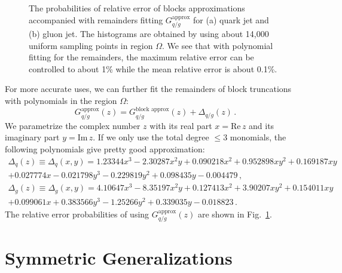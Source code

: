 \documentclass[letterpaper,11pt]{article}
\def\Fig#1{Fig.~{\ref{#1}}}
\DeclareRobustCommand{\Fig}[1]{Fig.~\ref{#1}}
\begin{document}
\begin{figure}[t]
\begin{center}
\qquad \quad
%
\caption{
%
The probabilities of relative error of blocks approximations accompanied with remainders fitting $G_{q/g}^{\text{approx}}$ for (a) quark jet and (b) gluon jet. The histograms are obtained by using about 14,000 uniform sampling points in region $\Omega$. We see that with polynomial fitting for the remainders, the maximum relative error can be controlled to about 1\% while the mean relative error is about 0.1\%.}
\label{fig:fit_approx_error}
\end{center}
\end{figure}

For more accurate uses, we can further fit the remainders of block truncations with polynomials in the region $\Omega$:
\begin{equation}
G_{q/g}^{\text{approx}} (z) =  G_{q/g}^{\text{block approx}}(z) + \Delta_{q/g}(z)\,.
\end{equation}
We parametrize the complex number $z$ with its real part $x=\mathrm{Re}\, z$ and its imaginary part $y = \mathrm{Im}\, z$. If we only use the total degree $\leq 3$ monomials, the following polynomials give pretty good approximation:
\begin{align}
\Delta_q(z)\equiv \Delta_q(x,y) = 1.23344 x^3-2.30287 x^2 y+0.090218 x^2+0.952898 x y^2+0.169187 x y\nonumber\\
+0.027774 x-0.021798 y^3-0.229819 y^2+0.098435 y-0.004479 \,,\\
\Delta_g(z)\equiv \Delta_g(x,y) = 4.10647 x^3-8.35197 x^2 y+0.127413 x^2+3.90207 x y^2+0.154011 x y \;\; \nonumber \\
+0.099061 x+0.383566 y^3-1.25266 y^2+0.339035 y-0.018823 \,.
\end{align}
The relative error probabilities of using $G_{q/g}^{\text{approx}} (z)$ are shown in \Fig{fig:fit_approx_error}.






\section{Symmetric Generalizations \label{sec:new_ratio}}
\end{document}
